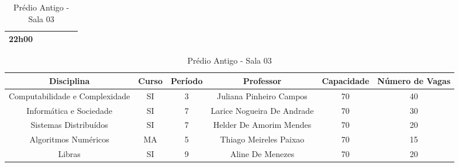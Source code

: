 \begin{apendices}
\begin{table}[!h]
\begin{adjustbox}{width=1\textwidth,center=\textwidth}
\begin{tabular}{|c|c|c|c|c|c|}
22h00 &  &  &  &  &  \\ \hline
\end{tabular}
\end{adjustbox}
\begin{adjustbox}{width=1\textwidth,center=\textwidth}
\centering
\begin{tabular}{|c|c|c|c|c|c|}
\hline
\textbf{Disciplina} & \textbf{Curso} & \textbf{Período} & \textbf{Professor} & \textbf{Capacidade} & \textbf{Número de Vagas} \\ \hline
Computabilidade e Complexidade & SI & 3 & Juliana Pinheiro Campos & 70 & 40 \\ \hline
Informática e Sociedade & SI & 7 & Larice Nogueira De Andrade & 70 & 30 \\ \hline
Sistemas Distribuídos & SI & 7 & Helder De Amorim Mendes & 70 & 20 \\ \hline
Algoritmos Numéricos & MA & 5 & Thiago Meireles Paixao & 70 & 15 \\ \hline
Libras & SI & 9 & Aline De Menezes & 70 & 20 \\ \hline
\end{tabular}
\end{adjustbox}
\caption{Prédio Antigo - Sala 03}
\end{table}


\end{apendices}
